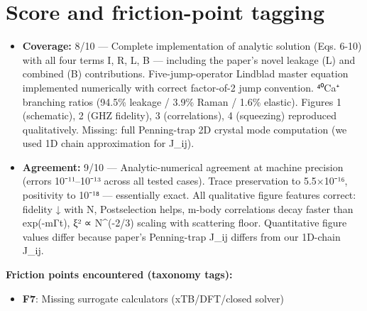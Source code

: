 \documentclass[11pt]{article}
\begin{document}
\section{Score and friction-point tagging}\label{sec:friction}
\begin{itemize}
\item \textbf{Coverage:} 8/10 --- Complete implementation of analytic solution (Eqs. 6-10) with all four terms I, R, L, B — including the paper's novel leakage (L) and combined (B) contributions. Five-jump-operator Lindblad master equation implemented numerically with correct factor-of-2 jump convention. ⁴⁰Ca⁺ branching ratios (94.5\% leakage / 3.9\% Raman / 1.6\% elastic). Figures 1 (schematic), 2 (GHZ fidelity), 3 (correlations), 4 (squeezing) reproduced qualitatively. Missing: full Penning-trap 2D crystal mode computation (we used 1D chain approximation for J\_ij).
\item \textbf{Agreement:} 9/10 --- Analytic-numerical agreement at machine precision (errors 10⁻¹¹–10⁻¹³ across all tested cases). Trace preservation to 5.5×10⁻¹⁶, positivity to 10⁻¹⁸ — essentially exact. All qualitative figure features correct: fidelity ↓ with N, Postselection helps, m-body correlations decay faster than exp(-mΓt), ξ² ∝ N\textasciicircum{}(-2/3) scaling with scattering floor. Quantitative figure values differ because paper's Penning-trap J\_ij differs from our 1D-chain J\_ij.
\end{itemize}

\noindent\textbf{Friction points encountered (taxonomy tags):}
\begin{itemize}
\item \textbf{F7}: Missing surrogate calculators (xTB/DFT/closed solver)
\end{itemize}
\end{document}

